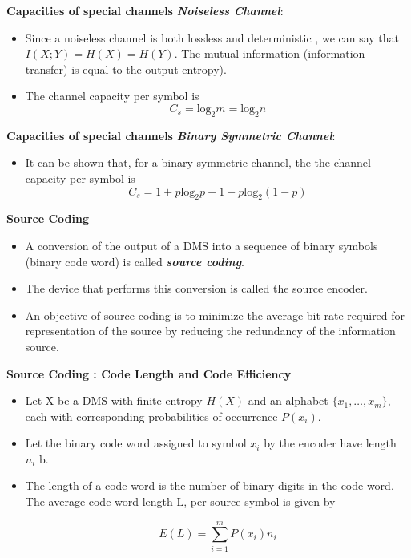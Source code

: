 \documentclass[a4]{beamer}
\begin{document}

\noindent \textbf{Capacities of special channels}
 \textbf{\emph{Noiseless Channel}}:
\begin{itemize}
\item Since a noiseless channel is both lossless and deterministic , we can say that $I(X;Y) = H(X) = H(Y)$.
The mutual information (information transfer) is equal to the output entropy). \item The channel capacity per symbol is
\[ C_s = \mbox{log}_2m = \mbox{log}_2n \]
\end{itemize}



\noindent \textbf{Capacities of special channels}
 \textbf{\emph{Binary Symmetric Channel}}:
\begin{itemize}
\item It can be shown that, for a binary symmetric channel, the the channel capacity per symbol is
\[ C_s = 1 + p\mbox{log}_2p  + 1-p\mbox{log}_2 (1-p)  \]
\end{itemize}



\noindent \textbf{Source Coding}
\begin{itemize}
\item A conversion of the output of a DMS into a sequence of binary symbols (binary code word) is
called \textbf{\emph{source coding}}.
\item  The device that performs this conversion is called the source encoder.
\item
An objective of source coding is to minimize the average bit rate required for representation of the
source by reducing the redundancy of the information source.
\end{itemize}



\noindent \textbf{Source Coding : Code Length and Code Efficiency}
\begin{itemize}

\item
Let X be a DMS with finite entropy $H(X)$ and an alphabet $\{x_1 , \ldots,  x_m\}$, each with corresponding
probabilities of occurrence $P(x_i)$. \item Let the binary code word assigned to symbol $x_i$ by
the encoder have length $n_i$ b. \item The length of a code word is the number of binary digits
in the code word. The average code word length L, per source symbol is given by

\[ E(L) = \sum ^{m}_{i=1} P(x_i) n_i \]
\end{itemize}
\end{document}
